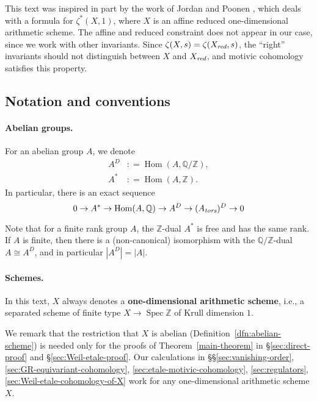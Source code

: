 \documentclass[draft]{article}
\DeclareMathOperator{\Hom}{Hom}
\DeclareMathOperator{\Spec}{Spec}
\newcommand{\QQ}{\mathbb{Q}}
\newcommand{\ZZ}{\mathbb{Z}}
\newcommand{\red}{\text{\it red}}
\newcommand{\tors}{\text{\it tors}}
\newcommand{\dfn}{\mathrel{\mathop:}=}
\theoremstyle{myplain}
\theoremstyle{mydefinition}
\numberwithin{equation}{section}
\begin{document}
This text was inspired in part by the work of Jordan and Poonen
\cite{Jordan-Poonen-2020}, which deals with a formula for $\zeta^* (X,1)$, where
$X$ is an affine reduced one-dimensional arithmetic scheme. The affine and
reduced constraint does not appear in our case, since we work with other
invariants. Since $\zeta (X,s) = \zeta (X_\red, s)$, the ``right'' invariants
should not distinguish between $X$ and $X_\red$, and motivic cohomology
satisfies this property.

\subsection*{Notation and conventions}

\paragraph{Abelian groups.}
For an abelian group $A$, we denote
\begin{align*}
  A^D & \dfn \Hom (A, \QQ/\ZZ), \\
  A^* & \dfn \Hom (A, \ZZ).
\end{align*}
In particular, there is an exact sequence
\begin{equation}
  \label{eqn:exact-sequence-A*-etc}
  0 \to A^* \to \Hom (A,\QQ) \to A^D \to (A_\tors)^D \to 0
\end{equation}

Note that for a finite rank group $A$, the $\ZZ$-dual $A^*$ is free and has the same
rank. If $A$ is finite, then there is a (non-canonical) isomorphism with the
$\QQ/\ZZ$-dual $A \cong A^D$, and in particular $|A^D| = |A|$.

\paragraph{Schemes.}
In this text, $X$ always denotes a \textbf{one-dimensional arithmetic scheme},
i.e., a separated scheme of finite type $X \to \Spec \ZZ$ of Krull dimension
$1$.

We remark that the restriction that $X$ is abelian
(Definition~\ref{dfn:abelian-scheme}) is needed only for the
proofs of Theorem~\ref{main-theorem} in \S\ref{sec:direct-proof} and
\S\ref{sec:Weil-etale-proof}. Our calculations in
\S\S\ref{sec:vanishing-order},
\ref{sec:GR-equivariant-cohomology},
\ref{sec:etale-motivic-cohomology},
\ref{sec:regulators},
\ref{sec:Weil-etale-cohomology-of-X}
work for any one-dimensional arithmetic scheme $X$.
\end{document}
